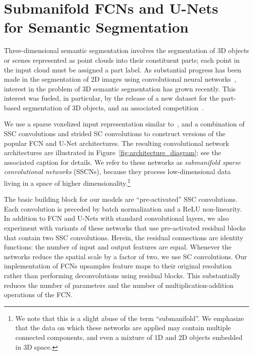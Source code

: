 \documentclass[10pt,twocolumn,letterpaper]{article}
\begin{document}
 \section{Submanifold FCNs and U-Nets\\for Semantic Segmentation}\label{sec:semantic}


Three-dimensional semantic segmentation involves the segmentation of 3D objects or scenes represented as point clouds into their constituent parts; each point in the input cloud must be assigned a part label.
As substantial progress has been made in the segmentation of 2D images using convolutional neural networks~\cite{long2015fully, ronneberger2015unet, yu2015multi}, interest in the problem of 3D semantic segmentation has grown recently. This interest was fueled, in particular, by the release of a new dataset for the part-based segmentation of 3D objects, and an associated competition~\cite{yi2017large}.

We use a sparse voxelized input representation similar to~\cite{graham2015sparse,engelcke2017vote3deep}, and a combination of SSC convolutions and strided SC convolutions to construct versions of the popular FCN \cite{long2015fully} and U-Net \cite{cciccek20163d} architectures. The resulting convolutional network architectures are illustrated in Figure~\ref{fig:architecture_diagram}; see the associated caption for details. We refer to these networks as \emph{submanifold sparse convolutional networks} (SSCNs), because they process low-dimensional data living in a space of higher dimensionality.\footnote{We note that this is a slight abuse of the term ``submanifold''. We emphasize that the data on which these networks are applied may contain multiple connected components, and even a mixture of 1D and 2D objects embedded in 3D space.}

The basic building block for our models are ``pre-activated'' SSC convolutions. Each convolution is preceded by batch normalization and a ReLU non-linearity. In addition to FCN and U-Nets with standard convolutional layers, we also experiment with variants of these networks that use pre-activated residual blocks \cite{ResNet} that contain two SSC convolutions. Herein, the residual connections are identity functions: the number of input and output features are equal.
Whenever the networks reduce the spatial scale by a factor of two, we use SC convolutions. Our implementation of FCNs upsamples feature maps to their original resolution rather than performing deconvolutions using residual blocks. This substantially reduces the number of parameters and the number of multiplication-addition operations of the FCN.
\end{document}
